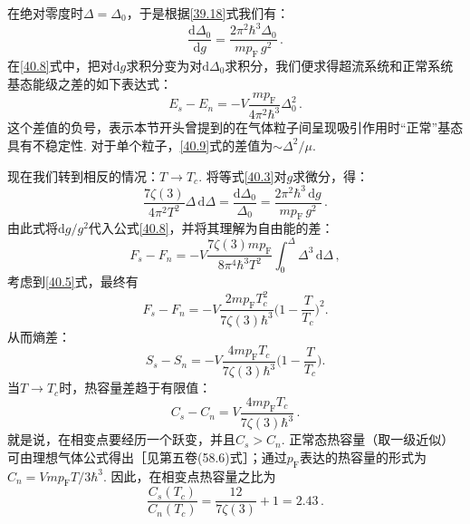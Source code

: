 在绝对零度时$\Delta=\Delta_0$，于是根据\eqref{39.18}式我们有：
\begin{equation*}
\frac{\mathrm d\Delta_0}{\mathrm dg} = \frac{2\pi^2\hbar^3\Delta_0}{mp_{\mathrm F}\,g^2}\,.
\end{equation*}
在\eqref{40.8}式中，把对$\mathrm dg$求积分变为对$\mathrm d\Delta_0$求积分，我们便求得超流系统和正常系统基态能级之差的如下表达式：
\begin{equation}
E_s - E_n = -V\frac{mp_{\mathrm F}}{4\pi^2\hbar^3}\Delta_0^2\,.
\label{40.9}
\end{equation}
这个差值的负号，表示本节开头曾提到的在气体粒子间呈现吸引作用时“正常”基态具有不稳定性. 对于单个粒子，\eqref{40.9}式的差值为$\sim\Delta^2/\mu$.

现在我们转到相反的情况：$T\to T_c$. 将等式\eqref{40.3}对$g$求微分，得：
\begin{equation*}
\frac{7\zeta(3)}{4\pi^2T^2}\Delta\,\mathrm d\Delta = \frac{\mathrm d\Delta_0}{\Delta_0}
= \frac{2\pi^2\hbar^3\,\mathrm dg}{mp_{\mathrm F}\,g^2}\,.
\end{equation*}
由此式将$\mathrm dg/g^2$代入公式\eqref{40.8}，并将其理解为自由能的差：
\begin{equation*}
F_s - F_n = -V\frac{7\zeta(3)mp_{\mathrm F}}{8\pi^4\hbar^3T^2}\int_0^{\Delta}\Delta^3\,\mathrm d\Delta\,,
\end{equation*}
考虑到\eqref{40.5}式，最终有
\begin{equation}
F_s - F_n = -V\frac{2mp_{\mathrm F}T_c^2}{7\zeta(3)\hbar^3}\Biggl(1-\frac{T}{T_c}\Biggr)^2.
\label{40.10}
\end{equation}
从而熵差：
\begin{equation*}
S_s - S_n = -V\frac{4mp_{\mathrm F}T_c}{7\zeta(3)\hbar^3}\Biggl(1-\frac{T}{T_c}\Biggr).
\end{equation*}
当$T\to T_c$时，热容量差趋于有限值：
\begin{equation}
C_s - C_n = V\frac{4mp_{\mathrm F}T_c}{7\zeta(3)\hbar^3}\,.
\label{40.11}
\end{equation}
就是说，在相变点要经历一个跃变，并且$C_s>C_n$. 正常态热容量（取一级近似）可由理想气体公式得出［见第五卷(58.6)式］；通过$p_{\mathrm F}$表达的热容量的形式为$C_n=Vmp_{\mathrm F}T/3\hbar^3$. 因此，在相变点热容量之比为
\begin{equation}
\frac{C_s(T_c)}{C_n(T_c)} = \frac{12}{7\zeta(3)} + 1 = 2.43\,.
\label{40.12}
\end{equation}

